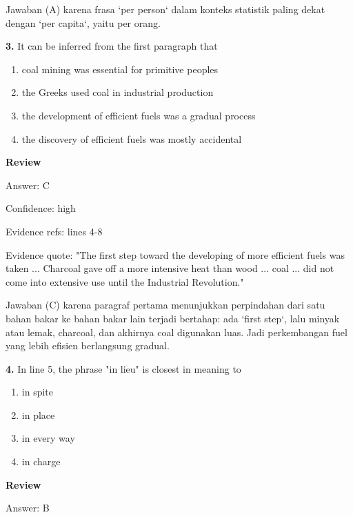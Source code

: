 \documentclass[12pt]{article}
\begin{document}
Jawaban (A) karena frasa `per person` dalam konteks statistik paling dekat dengan `per capita`, yaitu per orang.\par
\endgroup
\par
\vspace{0.25\baselineskip}
\noindent\textbf{3.} It can be inferred from the first paragraph that
\begin{enumerate}[label=(\Alph*),leftmargin=*,itemsep=0.2em]
\item coal mining was essential for primitive peoples
\item the Greeks used coal in industrial production
\item the development of efficient fuels was a gradual process
\item the discovery of efficient fuels was mostly accidental
\end{enumerate}
\par
\begingroup
\setlength{\parskip}{0pt}
\setlength{\parindent}{0pt}
\textbf{Review}\par
Answer: C\par
Confidence: high\par
Evidence refs: lines 4-8\par
Evidence quote: "The first step toward the developing of more efficient fuels was taken ... Charcoal gave off a more intensive heat than wood ... coal ... did not come into extensive use until the Industrial Revolution."\par
Jawaban (C) karena paragraf pertama menunjukkan perpindahan dari satu bahan bakar ke bahan bakar lain terjadi bertahap: ada `first step`, lalu minyak atau lemak, charcoal, dan akhirnya coal digunakan luas. Jadi perkembangan fuel yang lebih efisien berlangsung gradual.\par
\endgroup
\par
\vspace{0.25\baselineskip}
\noindent\textbf{4.} In line 5, the phrase "in lieu" is closest in meaning to
\begin{enumerate}[label=(\Alph*),leftmargin=*,itemsep=0.2em]
\item in spite
\item in place
\item in every way
\item in charge
\end{enumerate}
\par
\begingroup
\setlength{\parskip}{0pt}
\setlength{\parindent}{0pt}
\textbf{Review}\par
Answer: B\par
\end{document}
